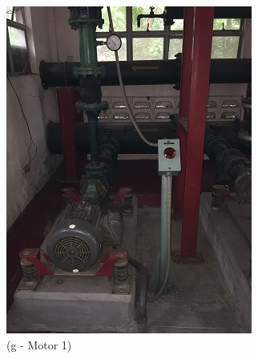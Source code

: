 \begin{figure}
\begin{minipage}[b]{0.22\linewidth}
		\includegraphics[width=\textwidth]{figures/asv_visual_motor1}
		\caption*{(g - Motor 1)}
	\end{minipage}
	\hspace{0.03cm}
\begin{minipage}[b]{0.22\linewidth}

\end{minipage}
\end{figure}
